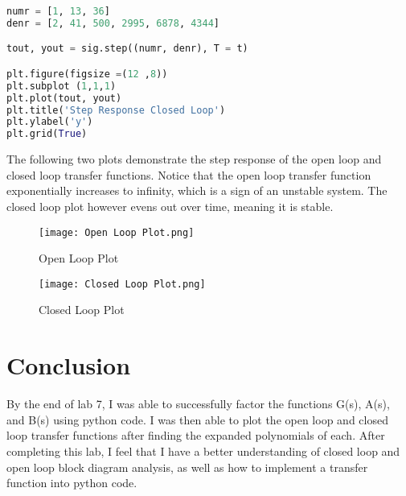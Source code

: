 \documentclass[12pt]{report}
\begin{document}
\begin{lstlisting}[language=Python, caption=Step Response Closed Loop Code]
numr = [1, 13, 36]
denr = [2, 41, 500, 2995, 6878, 4344]

tout, yout = sig.step((numr, denr), T = t)

plt.figure(figsize =(12 ,8))
plt.subplot (1,1,1)
plt.plot(tout, yout)
plt.title('Step Response Closed Loop')
plt.ylabel('y')
plt.grid(True)
\end{lstlisting}
\hspace{\parindent}The following two plots demonstrate the step response of the open loop and closed loop transfer functions. Notice that the open loop transfer function exponentially increases to infinity, which is a sign of an unstable system. The closed loop plot however evens out over time, meaning it is stable.
\begin{figure}[h!]
    \centering
    \texttt{[image: Open Loop Plot.png]}
    \caption{Open Loop Plot}
    \label{Figure x:}
\end{figure}
\begin{figure}[h!]
    \centering
    \texttt{[image: Closed Loop Plot.png]}
    \caption{Closed Loop Plot}
    \label{Figure x:}
\end{figure}

\section{Conclusion}
\hspace{\parindent}By the end of lab 7, I was able to successfully factor the functions G(s), A(s), and B(s) using python code. I was then able to plot the open loop and closed loop transfer functions after finding the expanded polynomials of each. After completing this lab, I feel that I have a better understanding of closed loop and open loop block diagram analysis, as well as how to implement a transfer function into python code.
\end{document}

